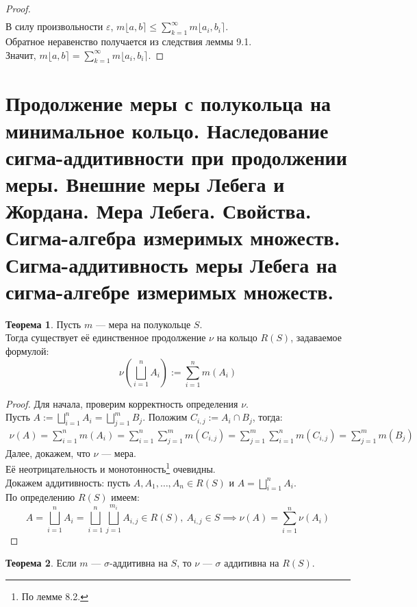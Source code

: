 \documentclass[11pt,a4paper]{report}
\def\eps{\varepsilon}
\theoremstyle{definition}
\theoremstyle{definition}
\newtheorem{theorem}{Теорема}[section]
\theoremstyle{definition}
\begin{document}
\begin{proof}
\begin{gather*}
		\end{gather*}
		В силу произвольности $ \eps $, $ m\lfloor a, b \rceil \le \sum_{k=1}^{\infty}{m\lfloor a_{i}, b_{i} \rceil } $.\\
		Обратное неравенство получается из следствия леммы 9.1.\\
		Значит, $ m\lfloor a, b \rceil = \sum_{k=1}^{\infty}{m\lfloor a_{i}, b_{i} \rceil } $.
	\end{proof}
	\section{Продолжение меры с полукольца на минимальное кольцо. Наследование сигма-аддитивности при продолжении меры. Внешние меры Лебега и Жордана. Мера Лебега. Свойства. Сигма-алгебра измеримых множеств. Сигма-аддитивность меры Лебега на сигма-алгебре измеримых множеств.}
	\begin{theorem}
		Пусть $ m $ — мера на полукольце $ S $.\\ 
		Тогда существует её единственное продолжение $ \nu $ на кольцо $ R(S) $, задаваемое формулой:
		\[ \nu\left (\bigsqcup_{i=1}^{n}{A_{i}}\right ) := \sum_{i=1}^{n}{m(A_{i})} \]
	\end{theorem}
	\begin{proof}
		Для начала, проверим корректность определения $ \nu $.\\
		Пусть $ A := \bigsqcup_{i=1}^{n}{A_{i}} = \bigsqcup_{j=1}^{m}{B_{j}} $. Положим $ C_{i, j} := A_{i} \cap B_{j} $, тогда: 
		\begin{gather*}
			\nu(A) = \sum_{i=1}^{n}{m(A_{i})} =   \sum_{i=1}^{n}{\sum_{j=1}^{m}{m(C_{i, j})}} = \sum_{j=1}^{m}{\sum_{i=1}^{n}{m(C_{i, j})}} = \sum_{j=1}^{m}{m(B_{j})}
		\end{gather*}
		Далее, докажем, что $ \nu $ — мера.\\
		Её неотрицательность и монотонность\footnote{По лемме 8.2.} очевидны.\\
		Докажем аддитивность: пусть $ A, A_{1}, \dots, A_{n} \in R(S) $ и $ A = \bigsqcup_{i=1}^{n}{A_{i}} $.\\
		По определению $ R(S) $ имеем:
	 \[ A = \bigsqcup_{i=1}^{n}{A_{i}} = \bigsqcup_{i=1}^{n}{\bigsqcup_{j=1}^{m_{i}}{A_{i, j}}} \in R(S),\ A_{i, j} \in S \implies \nu(A) = \sum_{i=1}^{n}{\nu(A_{i})} \]
	\end{proof}
	\begin{theorem}
		 Если $ m $ — $ \sigma $-аддитивна на $ S $, то $ \nu $ — $ \sigma $ аддитивна на $ R(S) $.
	\end{theorem}
\end{document}
